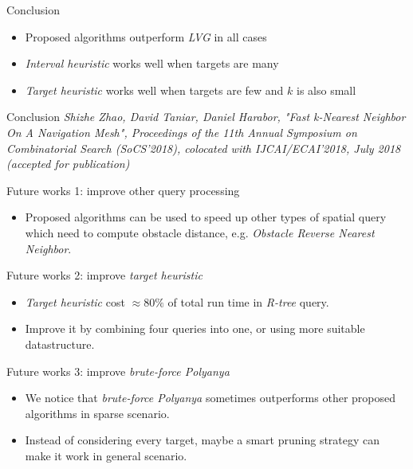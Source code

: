 \begin{frame}{Conclusion}
    \begin{itemize}
        \item Proposed algorithms outperform \textit{LVG} in all cases
        \item \textit{Interval heuristic} works well when targets are many
        \item \textit{Target heuristic} works well when targets are few and $k$ is also small
    \end{itemize}
\end{frame}

\begin{frame}{Conclusion}
  \textit{Shizhe Zhao, David Taniar, Daniel Harabor, "Fast k-Nearest Neighbor On A Navigation Mesh", Proceedings
    of the 11th Annual Symposium on Combinatorial Search (SoCS'2018), colocated with
    IJCAI/ECAI'2018, July 2018 (accepted for publication)}
\end{frame}

\begin{frame}{Future works 1: improve other query processing}
    \begin{itemize}
        \item \small{
            Proposed algorithms can be used to speed up other types of spatial query which need to compute obstacle distance, e.g. \textit{Obstacle Reverse Nearest Neighbor}.
        }
    \end{itemize}
\end{frame}

\begin{frame}{Future works 2: improve \textit{target heuristic}}
    \begin{itemize}
        \item \small {
          \textit{Target heuristic} cost $\approx 80\%$ of total run time in \textit{R-tree} query. 
        }
        \item \small {
            Improve it by combining four queries into one, or using more suitable datastructure.
        }
    \end{itemize}
\end{frame}

\begin{frame}{Future works 3: improve \textit{brute-force Polyanya}}
    \begin{itemize}
        \item \small {
            We notice that \textit{brute-force Polyanya} sometimes outperforms other proposed algorithms in sparse scenario.
        }
        \item \small {
            Instead of considering every target, maybe a smart pruning strategy can make it work in general scenario. 
        }
    \end{itemize}
\end{frame}
